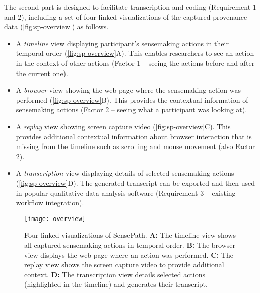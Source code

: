 The second part is designed to facilitate transcription and coding (Requirement 1 and 2), including a set of four linked visualizations of the captured provenance data (\autoref{fig:sp-overview}) as follows.

\begin{itemize}
\item A \emph{timeline} view displaying participant's sensemaking actions in their temporal order (\autoref{fig:sp-overview}A). This enables researchers to see an action in the context of other actions (Factor 1 -- seeing the actions before and after the current one).
\item A \emph{browser} view showing the web page where the sensemaking action was performed (\autoref{fig:sp-overview}B). This provides the contextual information of sensemaking actions (Factor 2 -- seeing what a participant was looking at).
\item A \emph{replay} view showing screen capture video (\autoref{fig:sp-overview}C). This provides additional contextual information about browser interaction that is missing from the timeline such as scrolling and mouse movement (also Factor 2).
\item A \emph{transcription} view displaying details of selected sensemaking actions (\autoref{fig:sp-overview}D). The generated transcript can be exported and then used in popular qualitative data analysis software (Requirement 3 -- existing workflow integration).
\end{itemize}

\begin{figure}
 	\centering
 	\texttt{[image: overview]}
 	\caption[Four linked visualizations of SensePath]{Four linked visualizations of SensePath. \textbf{A:} The timeline view shows all captured sensemaking actions in temporal order. \textbf{B:} The browser view displays the web page where an action was performed. \textbf{C:} The replay view shows the screen capture video to provide additional context. \textbf{D:} The transcription view details selected actions (highlighted in the timeline) and generates their transcript.}
 	\label{fig:sp-overview}
\end{figure}

